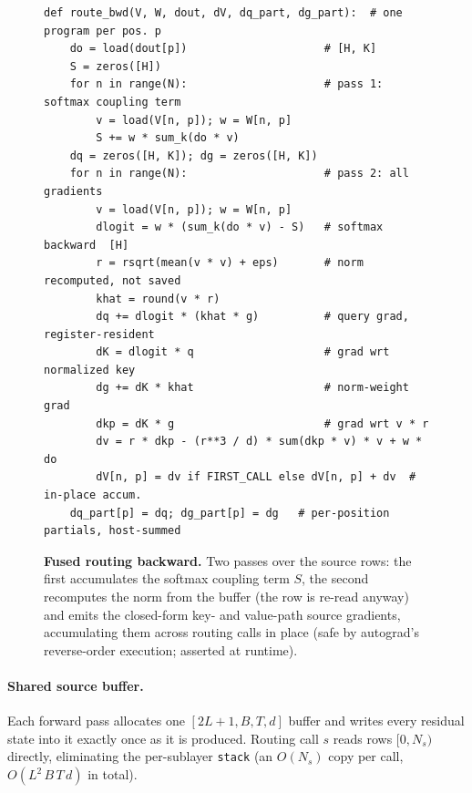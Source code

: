 \documentclass{article}
\begin{document}
\begin{figure}[h]
\begin{lstlisting}[style=mhar]
def route_bwd(V, W, dout, dV, dq_part, dg_part):  # one program per pos. p
    do = load(dout[p])                     # [H, K]
    S = zeros([H])
    for n in range(N):                     # pass 1: softmax coupling term
        v = load(V[n, p]); w = W[n, p]
        S += w * sum_k(do * v)
    dq = zeros([H, K]); dg = zeros([H, K])
    for n in range(N):                     # pass 2: all gradients
        v = load(V[n, p]); w = W[n, p]
        dlogit = w * (sum_k(do * v) - S)   # softmax backward  [H]
        r = rsqrt(mean(v * v) + eps)       # norm recomputed, not saved
        khat = round(v * r)
        dq += dlogit * (khat * g)          # query grad, register-resident
        dK = dlogit * q                    # grad wrt normalized key
        dg += dK * khat                    # norm-weight grad
        dkp = dK * g                       # grad wrt v * r
        dv = r * dkp - (r**3 / d) * sum(dkp * v) * v + w * do
        dV[n, p] = dv if FIRST_CALL else dV[n, p] + dv  # in-place accum.
    dq_part[p] = dq; dg_part[p] = dg   # per-position partials, host-summed
\end{lstlisting}
\caption{\textbf{Fused routing backward.} Two passes over the source rows: the
first accumulates the softmax coupling term $S$, the second recomputes the norm
from the buffer (the row is re-read anyway) and emits the closed-form key- and
value-path source gradients, accumulating them across routing calls in place
(safe by autograd's reverse-order execution; asserted at runtime).}
\label{fig:kernel_bwd}
\end{figure}

\paragraph{Shared source buffer.} Each forward pass allocates one
$[2L{+}1, B, T, d]$ buffer and writes every residual state into it exactly once as
it is produced. Routing call $s$ reads rows $[0, N_s)$ directly, eliminating the
per-sublayer \texttt{stack} (an $O(N_s)$ copy per call, $O(L^2\,B\,T\,d)$ in
total).
\end{document}

